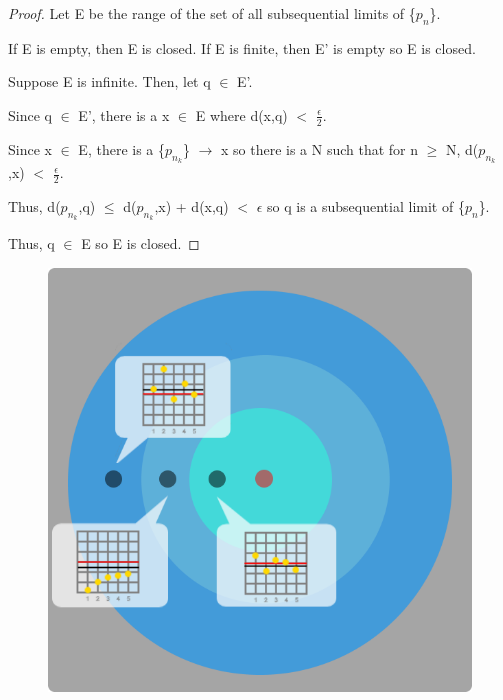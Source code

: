     \begin{proof}
        Let E be the range of the set of all subsequential limits of \{$p_n$\}.
        
        If E is empty, then E is closed.
        If E is finite, then E' is empty so E is closed.

        Suppose E is infinite. Then, let q $\in$ E'.

        Since q $\in$ E', there is a x $\in$ E where d(x,q) $<$ $\frac{\epsilon}{2}$.

        Since x $\in$ E, there is a \{$p_{n_k}$\} $\rightarrow$ x
        so there is a N such that for n $\geq$ N,
        d($p_{n_k}$,x) $<$ $\frac{\epsilon}{2}$.

        Thus, d($p_{n_k}$,q) $\leq$ d($p_{n_k}$,x) + d(x,q) $<$ $\epsilon$
        so q is a subsequential limit of \{$p_n$\}.
        
        Thus, q $\in$ E so E is closed.
    \end{proof}


        
    \begin{figure}[h]
        \centering
        \includegraphics[scale=0.3]{Images/8.2.4.png}
    \end{figure}





